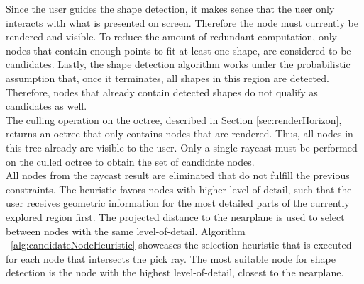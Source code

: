 Since the user guides the shape detection, it makes sense that the user only interacts with what is presented on screen. Therefore the node must currently be rendered and visible. To reduce the amount of redundant computation, only nodes that contain enough points to fit at least one shape, are considered to be candidates. Lastly, the shape detection algorithm works under the probabilistic assumption that, once it terminates, all shapes in this region are detected. Therefore, nodes that already contain detected shapes do not qualify as candidates as well. 
\\
The culling operation on the octree, described in Section \ref{sec:renderHorizon}, returns an octree that only contains nodes that are rendered. Thus, all nodes in this tree already are visible to the user. Only a single raycast must be performed on the culled octree to obtain the set of candidate nodes. 
\\
All nodes from the raycast result are eliminated that do not fulfill the previous constraints. The heuristic favors nodes with higher level-of-detail, such that the user receives geometric information for the most detailed parts of the currently explored region first. The projected distance to the nearplane is used to select between nodes with the same level-of-detail. Algorithm ~\ref{alg:candidateNodeHeuristic} showcases the selection heuristic that is executed for each node that intersects the pick ray. The most suitable node for shape detection is the node with the highest level-of-detail, closest to the nearplane. %

    

